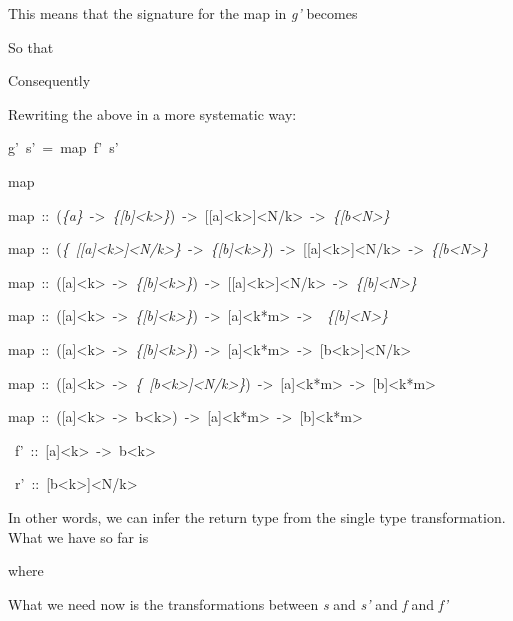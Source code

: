 \documentclass{article}
\newenvironment{lyxcode}
{\par\begin{list}{}{
\setlength{\rightmargin}{\leftmargin}
\setlength{\listparindent}{0pt}\raggedright
\setlength{\itemsep}{0pt}
\setlength{\parsep}{0pt}
\normalfont\ttfamily}\item[]}
{\end{list}}
\begin{document}
This means that the signature for the map in \emph{g'} becomes
\begin{lyxcode}

\end{lyxcode}
So that
\begin{lyxcode}

\end{lyxcode}
Consequently
\begin{lyxcode}



\end{lyxcode}
Rewriting the above in a more systematic way:
\begin{lyxcode}
g'~s'~=~map~f'~s'

map~~~~~~

map~::~(\emph{\{a\}}~->~\emph{\{{[}b{]}<k>\}})~->~{[}{[}a{]}<k>{]}<N/k>~->~\emph{\{{[}b<N>\}}

map~::~(\emph{\{}~\emph{{[}{[}a{]}<k>{]}<N/k>\}}~->~\emph{\{{[}b{]}<k>\}})~->~{[}{[}a{]}<k>{]}<N/k>~->~\emph{\{{[}b<N>\}}

map~::~({[}a{]}<k>~->~\emph{\{{[}b{]}<k>\}})~->~{[}{[}a{]}<k>{]}<N/k>~->~\emph{\{{[}b{]}<N>\}}

map~::~({[}a{]}<k>~->~\emph{\{{[}b{]}<k>\}})~->~{[}a{]}<k{*}m>~->~~\emph{\{{[}b{]}<N>\}}

map~::~({[}a{]}<k>~->~\emph{\{{[}b{]}<k>\}})~->~{[}a{]}<k{*}m>~->~{[}b<k>{]}<N/k>

map~::~({[}a{]}<k>~->~\emph{\{}~\emph{{[}b<k>{]}<N/k>\}})~->~{[}a{]}<k{*}m>~->~{[}b{]}<k{*}m>

map~::~({[}a{]}<k>~->~b<k>)~->~{[}a{]}<k{*}m>~->~{[}b{]}<k{*}m>

~f'~::~{[}a{]}<k>~->~b<k>

~r'~::~{[}b<k>{]}<N/k>
\end{lyxcode}
In other words, we can infer the return type from the single type
transformation. What we have so far is
\begin{lyxcode}











\end{lyxcode}
where
\begin{lyxcode}





\end{lyxcode}
What we need now is the transformations between \emph{s} and \emph{s'}
and \emph{f} and \emph{f'}
\end{document}
